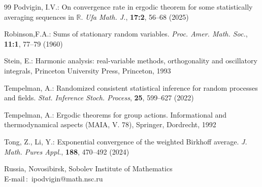 \documentclass[12pt]{article}
\begin{document}
\begin{thebibliography}{99}
Podvigin, I.V.: On convergence rate in ergodic theorem for some statistically averaging sequences in $\mathbb{R}$. \emph{Ufa Math. J.}, \textbf{17:2}, 56--68 (2025)	

Robinson,F.A.: Sums of stationary random variables. \emph{Proc. Amer. Math. Soc.}, \textbf{11:1}, 77--79 (1960)

Stein, E.: Harmonic analysis: real-variable methods, orthogonality and oscillatory integrals, Princeton University Press, Princeton, 1993

Tempelman, A.: Randomized consistent statistical inference for random processes and fields. \emph{Stat. Inference Stoch. Process}, \textbf{25}, 599--627 (2022)

Tempelman, A.: Ergodic theorems for group actions. Informational and thermodynamical aspects (MAIA, V. 78), Springer, Dordrecht, 1992

Tong, Z., Li, Y.: Exponential convergence of the weighted Birkhoff average. \emph{J. Math. Pures Appl.}, \textbf{188}, 470--492 (2024)



\end{thebibliography}

 {Russia, Novosibirsk, Sobolev Institute of Mathematics\\
E-mail\,$:$ ipodvigin@math.nsc.ru}
\end{document}

